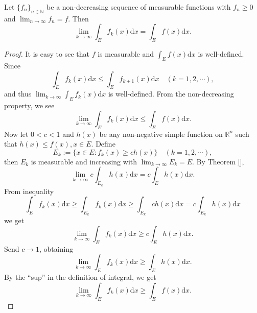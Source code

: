 \documentclass[11pt,singlecolumn, openany, citestyle=authoryear]{elegantbook}
\begin{document}
\begin{CJK}{UTF8}{gbsn}
\begin{theorem}
    Let $\{f_n\}_{n\in \mathbb{N}}$
be a non-decreasing sequence of measurable functions with $f_n \geq 0$ and 
$\displaystyle \lim_{n\to\infty}f_n=f$. Then
\begin{equation}
    \lim_{k\to\infty}\int_Ef_k(x)\mathrm{d}x = \int_Ef(x)\mathrm{d}x.
\end{equation}
\end{theorem}
\begin{proof}
    It is easy to see that $f$ is measurable and $\displaystyle \int_E f(x)\mathrm{d}x$
    is well-defined. Since 
    $$
    \int_E f_k(x)\mathrm{d}x\leqslant \int_E f_{k+1}(x)\mathrm{d}x\quad (k=1,2,\cdots),
    $$
    and thus $\displaystyle \lim_{k\to\infty}\int_E f_k(x)\mathrm{d}x$ is well-defined.
    From the non-decreasing property, we see 
    $$
    \lim_{k\to\infty}\int_E f_k(x)\mathrm{d}x \leqslant \int_E f(x)\mathrm{d}x.
    $$
    Now let $0<c<1$ and $h(x)$ be any non-negative simple function on $\mathbb{R}^n$ such that 
    $h(x)\leqslant f(x),x\in E$. Define 
    $$
    E_k := \{x\in E:f_k(x)\geqslant ch(x)\}\quad (k=1,2,\cdots),
    $$ 
    then $E_k$ is measurable and increasing with $\displaystyle \lim_{k\to\infty}E_k=E$.
    By Theorem \ref{},
    $$
    \lim_{k\to\infty}c\int_{E_k}h(x)\mathrm{d}x = c\int_E h(x)\mathrm{d}x.
    $$
    From inequality
    $$
    \int_E f_k(x)\mathrm{d}x\geqslant \int_{E_k} f_k(x)\mathrm{d}x \geqslant 
    \int_{E_k} ch(x)\mathrm{d}x=c\int_{E_k}h(x)\mathrm{d}x
    $$
    we get 
    $$
    \lim_{k\to\infty}\int_{E} f_k(x)\mathrm{d}x\geqslant c\int_Eh(x)\mathrm{d}x.
    $$
    Send $c\to 1$, obtaining 
    $$
    \lim_{k\to\infty}\int_E f_k(x)\mathrm{d}x \geqslant \int_E h(x)\mathrm{d}x.
    $$
    By the ``sup'' in the definition of integral, we get 
    $$
    \lim_{k\to\infty}\int_E f_k(x)\mathrm{d}x \geqslant \int_E f(x)\mathrm{d}x.
    $$
\end{proof}


\end{CJK}
\end{document}
